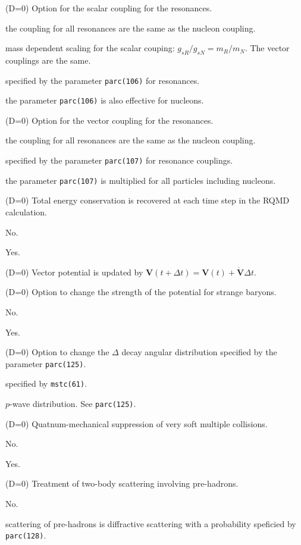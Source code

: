 \documentclass[]{article}
\newenvironment{entry}%
{\begin{list}{}{\setlength{\topsep}{0mm} \setlength{\itemsep}{0mm}
\setlength{\parskip}{0mm} \setlength{\parsep}{0mm}
\setlength{\leftmargin}{20mm} \setlength{\rightmargin}{0mm}
\setlength{\labelwidth}{18mm} \setlength{\labelsep}{2mm}}}%
{\end{list}}
\newenvironment{subentry}%
{\begin{list}{}{\setlength{\topsep}{0mm} \setlength{\itemsep}{0mm}
\setlength{\parskip}{0mm} \setlength{\parsep}{0mm}
\setlength{\leftmargin}{10mm} \setlength{\rightmargin}{0mm}
\setlength{\labelwidth}{18mm} \setlength{\labelsep}{2mm}}}%
{\end{list}}
\newcommand{\ttt}[1]{{\tt#1}}
\newcommand{\itemt}[1]{\item[{\tt #1}\hfill]}
\begin{document}
\begin{entry}
\itemt{mstc(121) :}(D=0) Option for the scalar coupling for the resonances.
 \begin{subentry}
    \itemt{$=0$ :} the coupling for all resonances are the same as the
     nucleon coupling.
    \itemt{$=1$ :} mass dependent scaling for the scalar couping:
    $g_{sR}/g_{sN}=m_R/m_N$. The vector couplings are the same.
    \itemt{$=2$ :} specified by the parameter \ttt{parc(106)} for resonances.
    \itemt{$=3$ :} the parameter \ttt{parc(106)} is also effective for
    nucleons.
 \end{subentry}

\itemt{mstc(122) :}(D=0) Option for the vector coupling for the resonances.
 \begin{subentry}
    \itemt{$=0$ :} the coupling for all resonances are the same as the
     nucleon coupling.
    \itemt{$=1$ :} specified by the parameter \ttt{parc(107)} for resonance
    couplings.
    \itemt{$=2$ :} the parameter \ttt{parc(107)} is multiplied for
    all particles including nucleons.
 \end{subentry}

\itemt{mstc(123) :}(D=0) Total energy conservation 
is recovered at each time step in the RQMD calculation.
 \begin{subentry}
    \itemt{$=0$ :} No.
    \itemt{$=1$ :} Yes.
 \end{subentry}

\itemt{mstc(124) :}(D=0) Vector potential is updated by 
$\bm{V}(t+\Delta t) = \bm{V}(t)+ \bm{\dot{V}}\Delta t$.

\itemt{mstc(125) :}(D=0) Option to change the strength of the potential
for strange baryons.
 \begin{subentry}
    \itemt{$=0$ :} No.
    \itemt{$=1$ :} Yes.
 \end{subentry}

\itemt{mstc(126) :}(D=0) Option to change the $\Delta$ decay angular
distribution specified by the parameter \ttt{parc(125)}.
 \begin{subentry}
    \itemt{$=0$ :} specified by \ttt{mstc(61)}.
    \itemt{$=1$ :} $p$-wave distribution. See \ttt{parc(125)}.
 \end{subentry}


\itemt{mstc(127) :}(D=0) Quatnum-mechanical suppression of very
soft multiple collisions.
 \begin{subentry}
    \itemt{$=0$ :} No.
    \itemt{$=1$ :} Yes.
 \end{subentry}

\itemt{mstc(128) :}(D=0) Treatment of two-body scattering
involving pre-hadrons. 
 \begin{subentry}
    \itemt{$=0$ :} No.
    \itemt{$=1$ :} scattering of pre-hadrons is diffractive scattering
    with a probability speficied by \ttt{parc(128)}.
 \end{subentry}



\end{entry}
\end{document}
